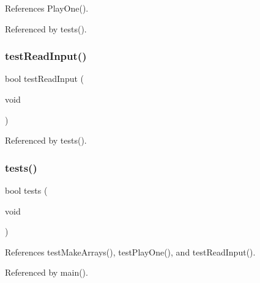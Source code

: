 References Play\+One().



Referenced by tests().

\mbox{\label{tests_8h_aa89f64db87aebe77bd891e2894595e4e}} 
\subsubsection{test\+Read\+Input()}
{\footnotesize\ttfamily bool test\+Read\+Input (\begin{DoxyParamCaption}\item[{void}]{ }\end{DoxyParamCaption})}



Referenced by tests().

\mbox{\label{tests_8h_a5e6e6e78df62797046c9ea173550a68a}} 
\subsubsection{tests()}
{\footnotesize\ttfamily bool tests (\begin{DoxyParamCaption}\item[{void}]{ }\end{DoxyParamCaption})}



References test\+Make\+Arrays(), test\+Play\+One(), and test\+Read\+Input().



Referenced by main().


